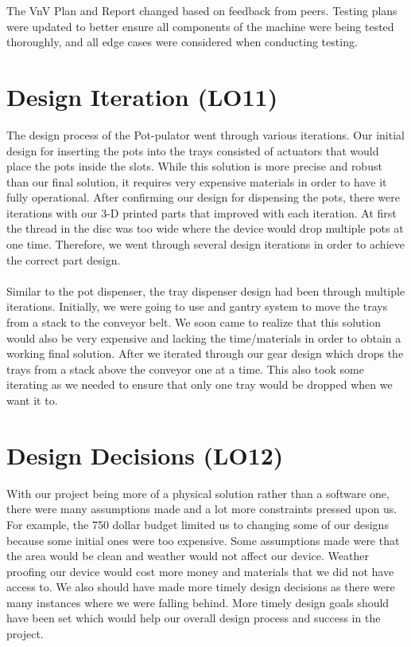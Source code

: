 \documentclass{article}
\begin{document}
The VnV Plan and Report changed based on feedback from peers. Testing plans were updated to better ensure all 
components of the machine were being tested thoroughly, and all edge cases were considered when conducting testing.
\section{Design Iteration (LO11)}

The design process of the Pot-pulator went through various iterations.
Our initial design for inserting the pots into the trays consisted of 
actuators that would place the pots inside the slots. While this solution 
is more precise and robust than our final solution, it requires very expensive
materials in order to have it fully operational. After confirming our design for dispensing the pots,
there were iterations with our 3-D printed parts that improved with each iteration.
At first the thread in the disc was too wide where the device would drop multiple pots at one time.
Therefore, we went through several design iterations in order to achieve the correct part design.\\\\

\noindent Similar to the pot dispenser, the tray dispenser design had been through multiple iterations.
Initially, we were going to use and gantry system to move the trays from a stack to the conveyor belt.
We soon came to realize that this solution would also be very expensive and lacking the time/materials in 
order to obtain a working final solution. After we iterated through our gear design which drops the trays
from a stack above the conveyor one at a time. This also took some iterating as we needed to ensure that only one tray 
would be dropped when we want it to.

\section{Design Decisions (LO12)}

With our project being more of a physical solution rather than a software one, 
there were many assumptions made and a lot more constraints pressed upon us.
For example, the 750 dollar budget limited us to changing some of our designs because some initial ones were too expensive.
Some assumptions made were that the area would be clean and weather would not affect our device.
Weather proofing our device would cost more money and materials that we did not have access to.
We also should have made more timely design decisions as there were many instances where we were falling behind.
More timely design goals should have been set which would help our overall design process and success in the project.
\end{document}

